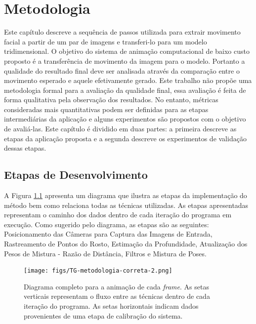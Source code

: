 \chapter{Metodologia}

Este capítulo descreve a sequência de passos utilizada para extrair movimento
facial a partir de um par de imagens e transferi-lo para um modelo
tridimensional. O objetivo do sistema de animação computacional de baixo 
custo proposto é a transferência de movimento
da imagem para o modelo. Portanto a qualidade do resultado final deve ser
analisada através da comparação entre o movimento esperado e aquele efetivamente
gerado. Este trabalho não propõe uma metodologia formal para a avaliação da
qualidade final, essa avaliação é feita de forma qualitativa pela observação dos
resultados. No entanto, métricas consideradas mais quantitativas podem ser
definidas para as etapas intermediárias da aplicação e alguns experimentos são
propostos com o objetivo de avaliá-las. Este capítulo é dividido em duas partes:
a primeira descreve as etapas da aplicação proposta e a segunda descreve os
experimentos de validação dessas etapas.

\section{Etapas de Desenvolvimento}

A Figura \ref{fig:metodologia} apresenta um diagrama que ilustra as etapas da
implementação do método bem como relaciona todas as técnicas utilizadas. As
etapas apresentadas representam  o caminho dos dados dentro de cada iteração do
programa em execução.  Como sugerido pelo diagrama, as etapas são as seguintes:
Posicionamento das Câmeras para Captura das Imagens de Entrada, Rastreamento de
Pontos do Rosto, Estimação da Profundidade, Atualização dos Pesos de Mistura -
Razão de Distância, Filtros e Mistura de Poses. 

\begin{figure}
\centering
\texttt{[image: figs/TG-metodologia-correta-2.png]}

\caption{Diagrama completo para a animação de cada \textit{frame}. As setas
verticais representam o fluxo entre as técnicas dentro de cada iteração do
programa. As setas horizontais indicam dados provenientes de uma etapa de
calibração do sistema.}

\label{fig:metodologia}
\end{figure}



